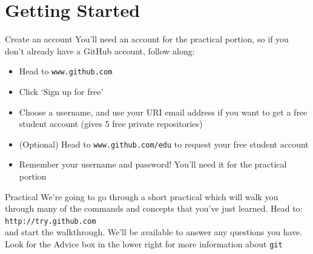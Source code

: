 \documentclass{beamer}
\begin{document}
\section{Getting Started}
\begin{frame}{Create an account}
  You'll need an account for the practical portion, so if you don't already
  have a GitHub account, follow along:
  \begin{itemize}
    \item Head to \texttt{www.github.com}
    \item Click `Sign up for free'
    \item Choose a username, and use your URI email address if you want to get
          a free student account (gives 5 free private repositories)
    \item (Optional) Head to \texttt{www.github.com/edu} to request your free
          student account
    \item Remember your username and password! You'll need it for the practical
          portion
  \end{itemize}


\end{frame}

\begin{frame}{Practical}
  We're going to go through a short practical which will walk you through many
  of the commands and concepts that you've just learned. Head to: \\

  \vfill
  \texttt{http://try.github.com} \\

  \vfill
  and start the walkthrough. We'll be available to answer any questions you have.
  Look for the Advice box in the lower right for more information about
  \texttt{git}
\end{frame}
\end{document}
